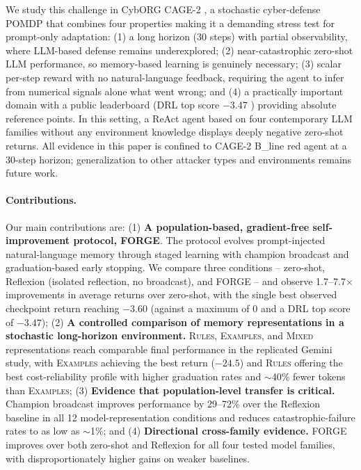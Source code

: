 \documentclass[sigconf]{acmart}
\begin{document}
We study this challenge in CybORG CAGE-2 \citep{kiely2023autonomous}, a stochastic cyber-defense POMDP that combines four properties making it a demanding stress test for prompt-only adaptation: (1) a long horizon (30 steps) with partial observability, where LLM-based defense remains underexplored; (2) near-catastrophic zero-shot LLM performance, so memory-based learning is genuinely necessary; (3) scalar per-step reward with no natural-language feedback, requiring the agent to infer from numerical signals alone what went wrong; and (4) a practically important domain with a public leaderboard (DRL top score $-3.47$ \cite{kiely2023autonomous}) providing absolute reference points. In this setting, a ReAct agent based on four contemporary LLM families without any environment knowledge displays deeply negative zero-shot returns. All evidence in this paper is confined to CAGE-2 B\_line red agent at a 30-step horizon; generalization to other attacker types and environments remains future work.

\paragraph{Contributions.}
Our main contributions are: 
(1) \textbf{A population-based, gradient-free self-improvement protocol, FORGE}. The protocol evolves prompt-injected natural-language memory through staged learning with champion broadcast and graduation-based early stopping. We compare three conditions -- zero-shot, Reflexion (isolated reflection, no broadcast), and FORGE -- and observe 1.7--7.7$\times$ improvements in average returns over zero-shot, with the single best observed checkpoint return reaching $-3.60$ (against a maximum of $0$ and a DRL top score of $-3.47$); 
(2) \textbf{A controlled comparison of memory representations in a stochastic long-horizon environment.} \textsc{Rules}, \textsc{Examples}, and \textsc{Mixed} representations reach comparable final performance in the replicated Gemini study, with \textsc{Examples} achieving the best return ($-24.5$) and \textsc{Rules} offering the best cost-reliability profile with higher graduation rates and $\sim$40\% fewer tokens than \textsc{Examples};
(3) \textbf{Evidence that population-level transfer is critical.} Champion broadcast improves performance by 29--72\% over the Reflexion baseline in all 12 model-representation conditions and reduces catastrophic-failure rates to as low as $\sim$1\%; and (4) \textbf{Directional cross-family evidence.} FORGE improves over both zero-shot and Reflexion for all four tested model families, with disproportionately higher gains on weaker baselines.
\end{document}
